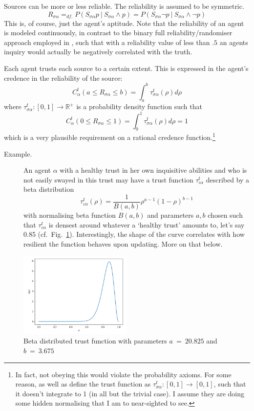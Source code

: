 \documentclass[11pt, a4paper]{scrartcl}
\newcommand{\Ssa}{S_{\sigma\alpha}}
\newcommand{\sa}{{\sigma\alpha}}
\newcommand{\given}[1][]{\:#1\vert\:}
\begin{document}
Sources can be more or less reliable. The reliability is assumed to be symmetric.
\[ 
R_{\sigma \alpha} =_{df.} P(\Ssa p \given \Ssa \land p) = P(\Ssa \neg p \given \Ssa \land \neg p)
\]
This is, of course, just the agent's aptitude. Note that the reliability of an agent is modeled continuously, in contrast to the binary full reliability/randomiser approach employed in \textcite[Chp. 3]{Bovens2003}, such that with a reliability value of less than $.5$ an agents inquiry would actually be negatively correlated with the truth.

Each agent trusts each source to a certain extent. This is expressed in the agent's credence in the reliability of the source:
\[ 
    C^t_{\alpha}(a \leqslant R_{\sa} \leqslant b) = \int_a^b \tau^t_{\sa}(\rho) d\rho
\]
where $\tau^t_{\sa}: [0,1] \rightarrow \mathbb{R}^+$ is a probability density function such that 
\[
    C^t_{\alpha}(0 \leqslant R_{\sa} \leqslant 1) =  \int_0^1 \tau^t_{\sa} (\rho) d\rho = 1
\]which is a very plausible requirement on a rational credence function.\footnote{In fact, not obeying this would violate the probability axioms. For some reason, \textcite{Angere2010} as well as \textcite{Olsson2013} define the trust function as $\tau^t_{\sa}: [0,1] \rightarrow [0,1]$, such that it doesn't integrate to 1 (in all but the trivial case). I assume they are doing some hidden normalising that I am to near-sighted to see.}

\begin{description}
    \item[Example.] An agent $\alpha$ with a healthy trust in her own inquisitive abilities and who is not easily swayed in this trust may have a trust function $\tau^t_{\iota\alpha}$ described by a beta distribution
\[
    \tau^t_{\iota\alpha} (\rho) = \frac{1}{B(a,b)} \rho^{a - 1} {(1 - \rho)}^{b-1}
\]
with normalising beta function $B(a,b)$ and parameters $a, b$ chosen such that $\tau^t_{\iota\alpha}$ is densest around whatever a `healthy trust' amounts to, let's say 0.85 (cf.~Fig.~\ref{fig:trf}). Interestingly, the shape of the curve correlates with how resilient the function behaves upon updating. More on that below.
\end{description}

\begin{figure}[ht]
	\centering
    \includegraphics[width=0.5\textwidth]{Figure_1.png}
	\caption{Beta distributed trust function with parameters $a~=~20.825$ and $b~=~3.675$\label{fig:trf}}
\end{figure}
\end{document}
